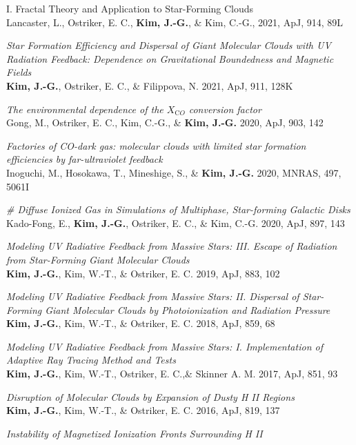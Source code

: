 \begin{benumerate}{22}
{I. Fractal Theory and Application to Star-Forming Clouds}\\
  Lancaster, L., Ostriker, E. C., \textbf{Kim, J.-G.}, \& Kim, C.-G., 2021, ApJ,
914, 89L
\item \textit{Star Formation Efficiency and Dispersal of Giant Molecular
    Clouds with UV Radiation Feedback: Dependence on Gravitational Boundedness
    and Magnetic Fields} \\ \textbf{Kim, J.-G.}, Ostriker, E. C., \& Filippova,
  N. 2021, ApJ, 911, 128K
\item \textit{The environmental dependence of the $X_{\mathrm CO}$ conversion
    factor}\\ Gong, M., Ostriker, E. C., Kim, C.-G., \& \textbf{Kim,
    J.-G.} 2020, ApJ, 903, 142
\item \textit{Factories of CO-dark gas: molecular clouds with limited star
formation efficiencies by far-ultraviolet feedback} \\
  Inoguchi, M., Hosokawa, T., Mineshige, S., \& \textbf{Kim, J.-G.} 2020, MNRAS,
  497, 5061I
\item \textit{\# Diffuse Ionized Gas in Simulations of Multiphase, Star-forming
    Galactic Disks}\\
  Kado-Fong, E., \textbf{Kim, J.-G.}, Ostriker, E. C., \& Kim, C.-G. 2020, ApJ,
  897, 143
\item \textit{Modeling UV Radiative Feedback from Massive Stars: III. Escape
    of Radiation from Star-Forming Giant Molecular Clouds} \\ \textbf{Kim,
    J.-G.}, Kim, W.-T., \& Ostriker, E. C. 2019, ApJ, 883, 102
\item \textit{Modeling UV Radiative Feedback from Massive Stars: II. Dispersal
of Star-Forming Giant Molecular Clouds by Photoionization and Radiation
Pressure} \\ \textbf{Kim, J.-G.}, Kim, W.-T., \& Ostriker, E. C. 2018, ApJ, 859,
68
\item \textit{Modeling UV Radiative Feedback from Massive Stars: I.
Implementation of Adaptive Ray Tracing Method and Tests}\\ \textbf{Kim, J.-G.},
Kim, W.-T., Ostriker, E. C.,\& Skinner A. M. 2017, ApJ, 851, 93
\item \textit{Disruption of Molecular Clouds by Expansion of Dusty H II
Regions}\\ \textbf{Kim, J.-G.}, Kim, W.-T., \& Ostriker, E. C. 2016, ApJ, 819,
137
\item \textit{Instability of Magnetized Ionization Fronts Surrounding H II
}
\end{benumerate}
